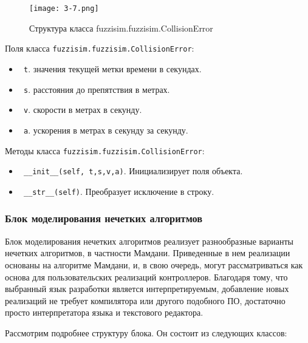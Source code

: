 \begin{figure}[ht]
	\centering
	\texttt{[image: 3-7.png]}
	\caption{ Структура класса fuzzisim.fuzzisim.CollisionError}
\end{figure}

Поля класса \lstinline!fuzzisim.fuzzisim.CollisionError!:
\begin{itemize}
	\item \lstinline! t!. значения текущей метки времени в секундах.
	\item \lstinline! s!. расстояния до препятствия в метрах.
	\item \lstinline! v!. скорости в метрах в секунду.
	\item \lstinline! a!. ускорения в метрах в секунду за секунду.
\end{itemize}


Методы класса \lstinline!fuzzisim.fuzzisim.CollisionError!:
\begin{itemize}
	\item \lstinline! __init__(self, t,s,v,a)!. Инициализирует поля объекта.
	\item \lstinline! __str__(self)!.  Преобразует исключение в строку.
\end{itemize}



\subsubsection{ Блок моделирования нечетких алгоритмов }

Блок моделирования нечетких алгоритмов реализует разнообразные варианты нечетких алгоритмов, в частности Мамдани. Приведенные в нем реализации основаны на алгоритме Мамдани, и, в свою очередь, могут рассматриваться как основа для пользовательских реализаций контроллеров. Благодаря тому, что выбранный язык разработки является интерпретируемым, добавление новых реализаций не требует компилятора или другого подобного ПО, достаточно просто интерпретатора языка и текстового редактора.

Рассмотрим подробнее структуру блока. Он состоит из следующих классов:

